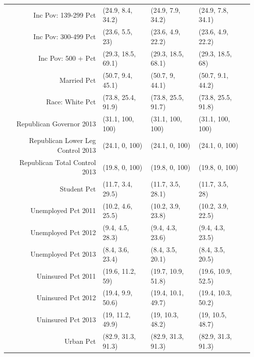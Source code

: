 \begin{table}[h!]
\begin{tabular}{rllll}
  Inc Pov: 139-299 Pct & (24.9, 8.4, 34.2) & (24.9, 7.9, 34.2) & (24.9, 7.8, 34.1) \\ 
  Inc Pov: 300-499 Pct & (23.6, 5.5, 23) & (23.6, 4.9, 22.2) & (23.6, 4.9, 22.2) \\ 
  Inc Pov: 500 + Pct & (29.3, 18.5, 69.1) & (29.3, 18.5, 68.1) & (29.3, 18.5, 68) \\ 
  Married Pct & (50.7, 9.4, 45.1) & (50.7, 9, 44.1) & (50.7, 9.1, 44.2) \\ 
  Race: White Pct & (73.8, 25.4, 91.9) & (73.8, 25.5, 91.7) & (73.8, 25.5, 91.8) \\ 
  Republican Governor 2013 & (31.1, 100, 100) & (31.1, 100, 100) & (31.1, 100, 100) \\ 
  Republican Lower Leg Control 2013 & (24.1, 0, 100) & (24.1, 0, 100) & (24.1, 0, 100) \\ 
  Republican Total Control 2013 & (19.8, 0, 100) & (19.8, 0, 100) & (19.8, 0, 100) \\ 
Student Pct & (11.7, 3.4, 29.5) & (11.7, 3.5, 28.1) & (11.7, 3.5, 28) \\ 
  Unemployed Pct 2011 & (10.2, 4.6, 25.5) & (10.2, 3.9, 23.8) & (10.2, 3.9, 22.5) \\ 
  Unemployed Pct 2012 & (9.4, 4.5, 28.3) & (9.4, 4.3, 23.6) & (9.4, 4.3, 23.5) \\ 
  Unemployed Pct 2013 & (8.4, 3.6, 23.4) & (8.4, 3.5, 20.1) & (8.4, 3.5, 20.5) \\ 
  Uninsured Pct 2011 & (19.6, 11.2, 59) & (19.7, 10.9, 51.8) & (19.6, 10.9, 52.5) \\ 
  Uninsured Pct 2012 & (19.4, 9.9, 50.6) & (19.4, 10.1, 49.7) & (19.4, 10.3, 50.2) \\ 
  Uninsured Pct 2013 & (19, 11.2, 49.9) & (19, 10.3, 48.2) & (19, 10.5, 48.7) \\ 
  Urban Pct & (82.9, 31.3, 91.3) & (82.9, 31.3, 91.3) & (82.9, 31.3, 91.3) \\ 
   \hline
\end{tabular}
\end{table}

